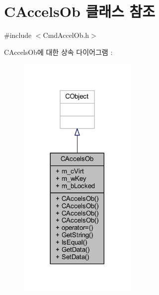 \hypertarget{class_c_accels_ob}{}\section{C\+Accels\+Ob 클래스 참조}
\label{class_c_accels_ob}


{\ttfamily \#include $<$Cmd\+Accel\+Ob.\+h$>$}



C\+Accels\+Ob에 대한 상속 다이어그램 \+: \nopagebreak
\begin{figure}[H]
\begin{center}
\leavevmode
\includegraphics[width=161pt]{class_c_accels_ob__inherit__graph}
\end{center}
\end{figure}


